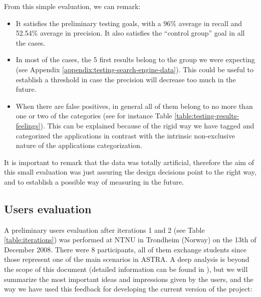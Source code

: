 From this simple evaluation, we can remark:

\begin{itemize}
  \item It satisfies the preliminary testing goals, with a 96\% average in
  recall and 52.54\% average in precision. It also satisfies the ``control
  group'' goal in all the cases.
  \item In most of the cases, the 5 first results belong to the group we were
  expecting (see Appendix \ref{appendix:testing-search-engine-data}). This could
  be useful to establish a threshold in case the precision will decrease too
  much in the future.
  \item When there are false positives, in general all of them belong to
  no more than one or two of the categories (see for instance
  Table \ref{table:testing-results-feelings}). This can be explained because of
  the rigid way we have tagged and categorized the applications in
  contrast with the intrinsic non-exclusive nature of the applications
  categorization.
\end{itemize}

It is important to remark that the data was totally artificial, therefore the
aim of this small evaluation was just assuring the design decisions point to the
right way, and to establish a possible way of measuring in the future.


\subsection{Users evaluation}
\label{subsubsec:testing-users-study}

A preliminary users evaluation after iterations 1 and 2 (see Table
\ref{table:iterations}) was performed at NTNU in Trondheim (Norway) on the 13th
of December 2008. There were 8 participants, all of them exchange students
since those represent one of the main scenarios in ASTRA.
A deep analysis is beyond the scope of this document (detailed information can
be found in \cite{astra-repo}), but we will summarize the most important ideas
and impressions given by the users, and the way we have used this feedback for
developing the current version of the project:

